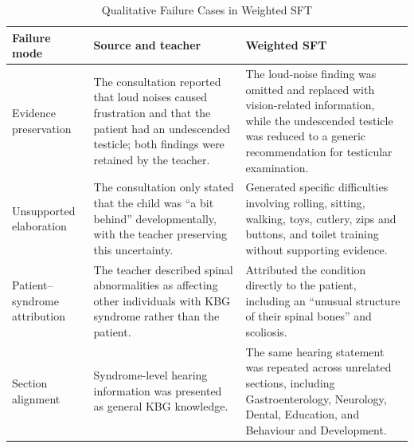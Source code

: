 \documentclass[ %
                    author={Aman Kumar Singh},
                supervisor={Dr. Edwin Simpson},
                    degree={MSc},
                     title={Quality-Aware Knowledge Distillation of Large Language Models for Efficient Personalised Clinical Report Generation},
                  subtitle={},
                      type={},
                      year={2021}]{dissertation}
\begin{document}
\vspace{-8pt}
\begin{table}[H]
\centering
\scriptsize
\caption{Qualitative Failure Cases in Weighted SFT}
\label{tab:weighted_sft_errors}
\begin{tabular}{p{} p{} p{}}
\hline
\textbf{Failure mode} & \textbf{Source and teacher} & \textbf{Weighted SFT} \\
\hline

Evidence preservation
&
The consultation reported that loud noises caused frustration and that the
patient had an undescended testicle; both findings were retained by the
teacher.
&
The loud-noise finding was omitted and replaced with vision-related
information, while the undescended testicle was reduced to a generic
recommendation for testicular examination.
\\

Unsupported elaboration
&
The consultation only stated that the child was ``a bit behind''
developmentally, with the teacher preserving this uncertainty.
&
Generated specific difficulties involving rolling, sitting, walking, toys,
cutlery, zips and buttons, and toilet training without supporting evidence.
\\

Patient--syndrome attribution
&
The teacher described spinal abnormalities as affecting other individuals
with KBG syndrome rather than the patient.
&
Attributed the condition directly to the patient, including an ``unusual
structure of their spinal bones'' and scoliosis.
\\

Section alignment
&
Syndrome-level hearing information was presented as general KBG knowledge.
&
The same hearing statement was repeated across unrelated sections,
including Gastroenterology, Neurology, Dental, Education, and Behaviour and
Development.
\\

\hline
\end{tabular}
\end{table}
\vspace{-8pt}
\end{document}

